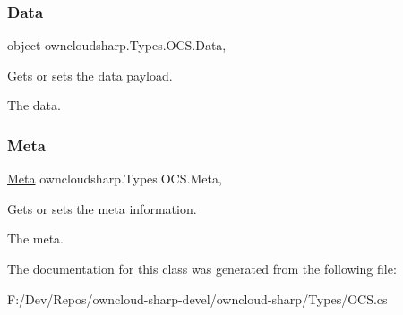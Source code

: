 \subsubsection{\texorpdfstring{Data}{Data}}
{\footnotesize\ttfamily object owncloudsharp.\+Types.\+O\+C\+S.\+Data\hspace{0.3cm}{\ttfamily [get]}, {\ttfamily [set]}}



Gets or sets the data payload. 

The data.\mbox{\label{classowncloudsharp_1_1_types_1_1_o_c_s_a7fed97a3502a80df264f5c38651be4c1}} 
\subsubsection{\texorpdfstring{Meta}{Meta}}
{\footnotesize\ttfamily \hyperlink{classowncloudsharp_1_1_types_1_1_meta}{Meta} owncloudsharp.\+Types.\+O\+C\+S.\+Meta\hspace{0.3cm}{\ttfamily [get]}, {\ttfamily [set]}}



Gets or sets the meta information. 

The meta.

The documentation for this class was generated from the following file\+:\begin{DoxyCompactItemize}
\item 
F\+:/\+Dev/\+Repos/owncloud-\/sharp-\/devel/owncloud-\/sharp/\+Types/O\+C\+S.\+cs\end{DoxyCompactItemize}
